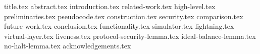 \documentclass{llncs}
\begin{document}
\pagestyle{plain}


{title.tex}
{abstract.tex}
{introduction.tex}
{related-work.tex}
{high-level.tex}
{preliminaries.tex}
{pseudocode.tex}
{construction.tex}
{security.tex}
{comparison.tex}
{future-work.tex}
{conclusion.tex}
{functionality.tex}
{simulator.tex}
{lightning.tex}
{virtual-layer.tex}
{liveness.tex}
{protocol-security-lemma.tex}
{ideal-balance-lemma.tex}
{no-halt-lemma.tex}
{acknowledgements.tex}


\end{document}

